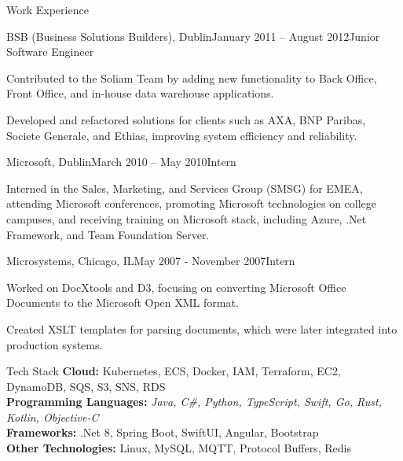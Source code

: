 \documentclass{résumé}
\begin{document}
\begin{rSection}{Work Experience}
\begin{rSubsection}{BSB (Business Solutions Builders), Dublin}{January 2011 – August 2012}{Junior Software Engineer}{}
    \item Contributed to the Soliam Team by adding new functionality to Back Office, Front Office, and in-house data warehouse applications.
    \item Developed and refactored solutions for clients such as AXA, BNP Paribas, Societe Generale, and Ethias, improving system efficiency and reliability.
\end{rSubsection}
\newpage
\begin{rSubsection}{Microsoft, Dublin}{March 2010 – May 2010}{Intern}{}
    \item Interned in the Sales, Marketing, and Services Group (SMSG) for EMEA, attending Microsoft conferences, promoting Microsoft technologies on college campuses, and receiving training on Microsoft stack, including Azure, .Net Framework, and Team Foundation Server.
\end{rSubsection}

\begin{rSubsection}{Microsystems, Chicago, IL}{May 2007 - November 2007}{Intern}{}
    \item Worked on DocXtools and D3, focusing on converting Microsoft Office Documents to the Microsoft Open XML format.
    \item Created XSLT templates for parsing documents, which were later integrated into production systems.
\end{rSubsection}

\end{rSection}

\begin{rSection}{Tech Stack}
\textbf{Cloud:} Kubernetes, ECS, Docker, IAM, Terraform, EC2, DynamoDB, SQS, S3, SNS, RDS \\
\textbf{Programming Languages:} \textit{Java, C\#, Python, TypeScript, Swift, Go, Rust, Kotlin, Objective-C} \\
\textbf{Frameworks:} .Net 8, Spring Boot, SwiftUI, Angular, Bootstrap \\
\textbf{Other Technologies:} Linux, MySQL, MQTT, Protocol Buffers, Redis
\end{rSection}
\end{document}
